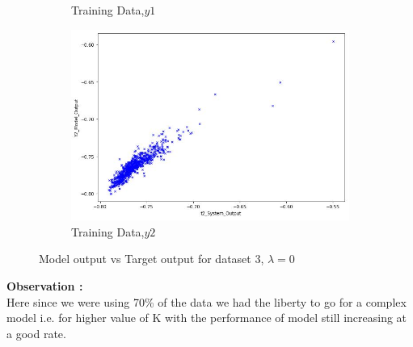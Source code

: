 \documentclass[11pt]{article}
\begin{document}
\begin{figure}[h]
\begin{subfigure}[b]{0.4\textwidth}
	\caption{Training Data,$y1$}
	\label{fig:fig3.2.1.3}
	\end{subfigure}
	\hfill
	\begin{subfigure}[b]{0.4\textwidth}
	\centering
	\includegraphics[scale=0.35]{dataset3_k10_lambda0_train2.jpg}
	\caption{Training Data,$y2$}
	\label{fig:fig3.2.1.4}
	\end{subfigure}
\caption{Model output vs Target output for dataset 3, $\lambda = 0$}
\label{fig:fig3.2.1}
\end{figure}

\textbf{Observation :} \\
Here since we were using 70\% of the data we had the liberty to go for a complex model i.e. for higher value of K with the performance of model still increasing at a good rate.
\end{document}
